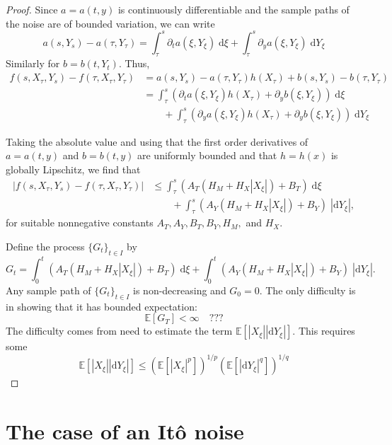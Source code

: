 \documentclass[reqno,12pt]{amsart}
\theoremstyle{plain}%
\theoremstyle{definition}
\begin{document}
\begin{proof}
    Since $a=a(t, y)$ is continuously differentiable and the sample paths of the noise are of bounded variation, we can write
    \[ a(s, Y_s) - a(\tau, Y_\tau) = \int_\tau^s \partial_t a(\xi, Y_\xi) \;\mathrm{d}\xi + \int_\tau^s \partial_y a(\xi, Y_\xi)\;\mathrm{d}Y_\xi
    \]
    Similarly for $b=b(t, Y_t)$. Thus,
    \begin{align*}
        f(s, X_\tau, Y_s) - f(\tau, X_\tau, Y_\tau) & = a(s, Y_s) - a(\tau, Y_\tau)h(X_\tau) + b(s, Y_s) - b(\tau, Y_\tau) \\
        & = \int_\tau^s \left(\partial_t a(\xi, Y_\xi)h(X_\tau) + \partial_y b(\xi, Y_\xi)\right) \;\mathrm{d}\xi \\
        & \qquad + \int_\tau^s \left(\partial_y a(\xi, Y_\xi) h(X_\tau) + \partial_y b(\xi, Y_\xi)\right)\;\mathrm{d}Y_\xi
    \end{align*}

    Taking the absolute value and using that the first order derivatives of $a=a(t, y)$ and $b=b(t, y)$ are uniformly bounded and that $h=h(x)$ is globally Lipschitz, we find that
    \begin{align*}
        |f(s, X_\tau, Y_s) - f(\tau, X_\tau, Y_\tau)| & \leq \int_\tau^s \left(A_T(H_M + H_X|X_\xi|) + B_T\right) \;\mathrm{d}\xi \\
        & \qquad + \int_\tau^s \left(A_Y (H_M + H_X|X_\xi|) + B_Y\right)\;|\mathrm{d}Y_\xi|,
    \end{align*}
    for suitable nonnegative constants $A_T, A_Y, B_T, B_Y, H_M,$ and $H_X$.

    Define the process $\{G_t\}_{t\in I}$ by
    \[
        G_t = \int_0^t \left(A_T(H_M + H_X|X_\xi|) + B_T\right) \;\mathrm{d}\xi + \int_0^t \left(A_Y (H_M + H_X|X_\xi|) + B_Y\right)\;|\mathrm{d}Y_\xi|.
    \]
    Any sample path of $\{G_t\}_{t\in I}$ is non-decreasing and $G_0 = 0$. The only difficulty is in showing that it has bounded expectation:
    \[
        \mathbb{E}[G_T] < \infty \quad ???
    \]
    The difficulty comes from need to estimate the term $\mathbb{E}[|X_\xi||\mathrm{d}Y_\xi|]$. This requires some
    \[
        \mathbb{E}[|X_\xi||\mathrm{d}Y_\xi|] \leq (\mathbb{E}[|X_\xi|^p])^{1/p}(\mathbb{E}[|\mathrm{d}Y_\xi|^q])^{1/q}
    \]
\end{proof}

\section{The case of an It\^o noise}
\end{document}

